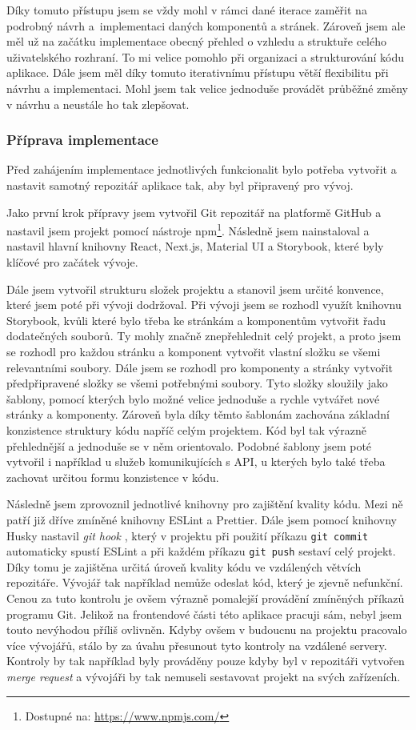 Díky tomuto přístupu jsem se vždy mohl v rámci dané iterace zaměřit na podrobný návrh a~implementaci daných komponentů a stránek. Zároveň jsem ale měl už na začátku implementace obecný přehled o vzhledu a struktuře celého uživatelského rozhraní. To mi velice pomohlo při organizaci a strukturování kódu aplikace. Dále jsem měl díky tomuto iterativnímu přístupu větší flexibilitu při návrhu a implementaci. Mohl jsem tak velice jednoduše provádět průběžné změny v návrhu a neustále ho tak zlepšovat.

\subsubsection{Příprava implementace}

Před zahájením implementace jednotlivých funkcionalit bylo potřeba vytvořit a nastavit samotný repozitář aplikace tak, aby byl připravený pro vývoj.

Jako první krok přípravy jsem vytvořil Git repozitář na platformě GitHub a nastavil jsem projekt pomocí nástroje npm\footnote{Dostupné na: \href{https://www.npmjs.com/}{https://www.npmjs.com/}}. Následně jsem nainstaloval a nastavil hlavní knihovny React, Next.js, Material UI a Storybook, které byly klíčové pro začátek vývoje.

Dále jsem vytvořil strukturu složek projektu a stanovil jsem určité konvence, které jsem poté při vývoji dodržoval. Při vývoji jsem se rozhodl využít knihovnu Storybook, kvůli které bylo třeba ke stránkám a komponentům vytvořit řadu dodatečných souborů. Ty mohly značně znepřehlednit celý projekt, a proto jsem se rozhodl pro každou stránku a komponent vytvořit vlastní složku se všemi relevantními soubory. Dále jsem se rozhodl pro komponenty a stránky vytvořit předpřipravené složky se všemi potřebnými soubory. Tyto složky sloužily jako šablony, pomocí kterých bylo možné velice jednoduše a rychle vytvářet nové stránky a komponenty. Zároveň byla díky těmto šablonám zachována základní konzistence struktury kódu napříč celým projektem. Kód byl tak výrazně přehlednější a jednoduše se v něm orientovalo. Podobné šablo\-ny jsem poté vytvořil i například u služeb komunikujících s API, u kterých bylo také třeba zachovat určitou formu konzistence v kódu.

Následně jsem zprovoznil jednotlivé knihovny pro zajištění kvality kódu. Mezi ně patří již dříve zmíněné knihovny ESLint a Prettier. Dále jsem pomocí knihovny Husky nastavil \textit{git hook} \cite{GitHook}, který v projektu při použití příkazu \texttt{git commit} automaticky spustí ESLint a při každém příkazu \texttt{git push} sestaví celý projekt. Díky tomu je zajištěna určitá úroveň kvality kódu ve vzdálených větvích repozitáře. Vývojář tak například nemůže odeslat kód, který je zjevně nefunkční. Cenou za tuto kontrolu je ovšem výrazně pomalejší provádění zmí\-něných příkazů programu Git. Jelikož na frontendové části této aplikace pracuji sám, nebyl jsem touto nevýhodou příliš ovlivněn. Kdyby ovšem v budoucnu na projektu pracovalo více vývojářů, stálo by za úvahu přesunout tyto kontroly na vzdálené servery. Kontroly by tak například byly prováděny pouze kdyby byl v repozitáři vytvořen \textit{merge request} a vývojáři by tak nemuseli sestavovat projekt na svých zařízeních.

